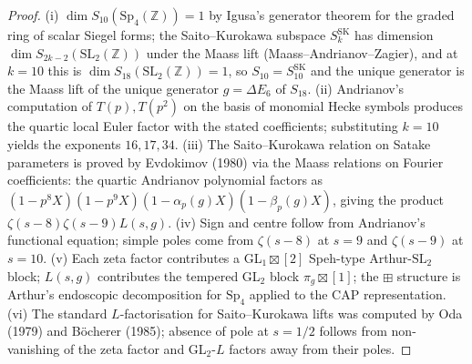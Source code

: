 \begin{proof}
\textup{(i)} $\dim S_{10}(\mathrm{Sp}_4(\mathbb{Z})) = 1$ by Igusa's generator theorem for the graded ring of scalar Siegel forms; the Saito--Kurokawa subspace $S_k^{\mathrm{SK}}$ has dimension $\dim S_{2k-2}(\mathrm{SL}_2(\mathbb{Z}))$ under the Maass lift (Maass--Andrianov--Zagier), and at $k=10$ this is $\dim S_{18}(\mathrm{SL}_2(\mathbb{Z})) = 1$, so $S_{10} = S_{10}^{\mathrm{SK}}$ and the unique generator is the Maass lift of the unique generator $g = \Delta E_6$ of $S_{18}$. \textup{(ii)} Andrianov's computation of $T(p), T(p^2)$ on the basis of monomial Hecke symbols produces the quartic local Euler factor with the stated coefficients; substituting $k=10$ yields the exponents $16, 17, 34$. \textup{(iii)} The Saito--Kurokawa relation on Satake parameters is proved by Evdokimov (1980) via the Maass relations on Fourier coefficients: the quartic Andrianov polynomial factors as $(1 - p^8 X)(1 - p^9 X)(1 - \alpha_p(g) X)(1 - \beta_p(g) X)$, giving the product $\zeta(s-8)\zeta(s-9)L(s,g)$. \textup{(iv)} Sign and centre follow from Andrianov's functional equation; simple poles come from $\zeta(s-8)$ at $s=9$ and $\zeta(s-9)$ at $s=10$. \textup{(v)} Each zeta factor contributes a GL$_1 \boxtimes [2]$ Speh-type Arthur-$\mathrm{SL}_2$ block; $L(s,g)$ contributes the tempered GL$_2$ block $\pi_g \boxtimes [1]$; the $\boxplus$ structure is Arthur's endoscopic decomposition for $\mathrm{Sp}_4$ applied to the CAP representation. \textup{(vi)} The standard $L$-factorisation for Saito--Kurokawa lifts was computed by Oda (1979) and B\"ocherer (1985); absence of pole at $s = 1/2$ follows from non-vanishing of the zeta factor and GL$_2$-$L$ factors away from their poles.
\end{proof}

